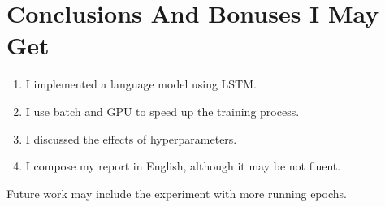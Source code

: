 \documentclass[UTF8, a4paper, 11pt]{article}
\begin{document}
\section{Conclusions And Bonuses I May Get}
\begin{enumerate}
      \item I implemented a language model using LSTM.
      \item I use batch and GPU to speed up the training process.
      \item I discussed the effects of hyperparameters.
      \item I compose my report in English, although it may be not fluent.
\end{enumerate}

Future work may include the experiment with more running epochs.
%
%
\end{document}
